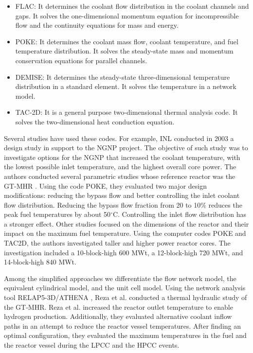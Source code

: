 \documentclass[11pt,letterpaper]{article}
\begin{document}
\begin{itemize}
\item FLAC: It determines the coolant flow distribution in the coolant channels and gaps.
It solves the one-dimensional momentum equation for incompressible flow and the continuity equations for mass and energy.

\item POKE: It determines the coolant mass flow, coolant temperature, and fuel temperature distribution.
It solves the steady-state mass and momentum conservation equations for parallel channels.

\item DEMISE: It determines the steady-state three-dimensional temperature distribution in a standard element.
It solves the temperature in a network model.

\item TAC-2D: It is a general purpose two-dimensional thermal analysis code.
It solves the two-dimensional heat conduction equation.
\end{itemize}

Several studies have used these codes.
For example, \gls{INL} conducted in 2003 a design study \cite{macdonald_ngnp_2003} in support to the \gls{NGNP} project.
The objective of such study was to investigate options for the NGNP that increased the coolant temperature, with the lowest possible inlet temperature, and the highest overall core power.
The authors conducted several parametric studies whose reference reactor was the GT-MHR \cite{general_atomics_gas_1996}.
Using the code POKE, they evaluated two major design modifications: reducing the bypass flow and better controlling the inlet coolant flow distribution.
Reducing the bypass flow fraction from 20 to 10$\%$ reduces the peak fuel temperatures by about 50$^{\circ}$C.
Controlling the inlet flow distribution has a stronger effect.
Other studies focused on the dimensions of the reactor and their impact on the maximum fuel temperature.
Using the computer codes POKE and TAC2D, the authors investigated taller and higher power reactor cores.
The investigation included a 10-block-high 600 MWt, a 12-block-high 720 MWt, and 14-block-high 840 MWt.

Among the simplified approaches we differentiate the flow network model, the equivalent cylindrical model, and the unit cell model.
Using the network analysis tool RELAP5-3D/ATHENA \cite{inl_relap5-3dathena_2005}, Reza et al. \cite{reza_design_2006} conducted a thermal hydraulic study of the GT-MHR.
Reza et al. increased the reactor outlet temperature to enable hydrogen production.
Additionally, they evaluated alternative coolant inflow paths in an attempt to reduce the reactor vessel temperatures.
After finding an optimal configuration, they evaluated the maximum temperatures in the fuel and the reactor vessel during the \gls{LPCC} and the \gls{HPCC} events.
\end{document}
